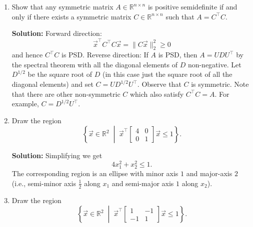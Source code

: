 \documentclass[10pt]{article}
\newcommand{\RR}{\mathbb{R}}
\begin{document}
\begin{enumerate}[label=(\alph*)]
    \item Show that any symmetric matrix $A \in \RR^{n \times n}$ is positive semidefinite if and only if there exists a symmetric matrix $C \in \RR^{n \times n}$ such that $A = C^\top C$.

    \textbf{Solution:} Forward direction:
    \begin{equation}
        \vec{x}^\top C^\top C\vec{x} = \|C\vec{x}\|_2^2 \geq 0
    \end{equation}
    and hence $C^\top C$ is PSD. Reverse direction: If $A$ is PSD, then $A = UDU^\top$ by the spectral theorem with all the diagonal elements of $D$ non-negative. Let $D^{1/2}$ be the square root of $D$ (in this case just the square root of all the diagonal elements) and set $C = UD^{1/2}U^\top$. Observe that $C$ is symmetric. Note that there are other non-symmetric $C$ which also satisfy $C^\top C = A$. For example, $C = D^{1/2}U^\top$.

    \item Draw the region
    \[
        \left\{ \vec{x} \in \RR^2 \;\middle|\; \vec{x}^\top \begin{bmatrix} 4 & 0 \\ 0 & 1 \end{bmatrix} \vec{x} \leq 1 \right\}.
    \]

    \textbf{Solution:} Simplifying we get
    \begin{equation}
        4x_1^2 + x_2^2 \leq 1.
    \end{equation}
    The corresponding region is an ellipse with minor axis $1$ and major-axis $2$ (i.e., semi-minor axis $\frac{1}{2}$ along $x_1$ and semi-major axis $1$ along $x_2$).

    \item Draw the region
    \[
        \left\{ \vec{x} \in \RR^2 \;\middle|\; \vec{x}^\top \begin{bmatrix} 1 & -1 \\ -1 & 1 \end{bmatrix} \vec{x} \leq 1 \right\}.
    \]


\end{enumerate}
\end{document}
